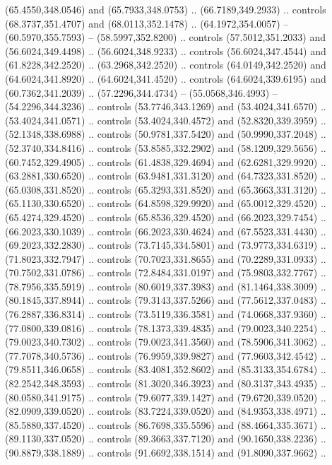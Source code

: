 \begin{scope}[cm={{1.25,0.0,0.0,-1.25,(0.0,743.43331)}}]
    (65.4550,348.0546) and (65.7933,348.0753) .. (66.7189,349.2933) .. controls
    (68.3737,351.4707) and (68.0113,352.1478) .. (64.1972,354.0057) --
    (60.5970,355.7593) -- (58.5997,352.8200) .. controls (57.5012,351.2033) and
    (56.6024,349.4498) .. (56.6024,348.9233) .. controls (56.6024,347.4544) and
    (61.8228,342.2520) .. (63.2968,342.2520) .. controls (64.0149,342.2520) and
    (64.6024,341.8920) .. (64.6024,341.4520) .. controls (64.6024,339.6195) and
    (60.7362,341.2039) .. (57.2296,344.4734) -- (55.0568,346.4993) --
    (54.2296,344.3236) .. controls (53.7746,343.1269) and (53.4024,341.6570) ..
    (53.4024,341.0571) .. controls (53.4024,340.4572) and (52.8320,339.3959) ..
    (52.1348,338.6988) .. controls (50.9781,337.5420) and (50.9990,337.2048) ..
    (52.3740,334.8416) .. controls (53.8585,332.2902) and (58.1209,329.5656) ..
    (60.7452,329.4905) .. controls (61.4838,329.4694) and (62.6281,329.9920) ..
    (63.2881,330.6520) .. controls (63.9481,331.3120) and (64.7323,331.8520) ..
    (65.0308,331.8520) .. controls (65.3293,331.8520) and (65.3663,331.3120) ..
    (65.1130,330.6520) .. controls (64.8598,329.9920) and (65.0012,329.4520) ..
    (65.4274,329.4520) .. controls (65.8536,329.4520) and (66.2023,329.7454) ..
    (66.2023,330.1039) .. controls (66.2023,330.4624) and (67.5523,331.4430) ..
    (69.2023,332.2830) .. controls (73.7145,334.5801) and (73.9773,334.6319) ..
    (71.8023,332.7947) .. controls (70.7023,331.8655) and (70.2289,331.0933) ..
    (70.7502,331.0786) .. controls (72.8484,331.0197) and (75.9803,332.7767) ..
    (78.7956,335.5919) .. controls (80.6019,337.3983) and (81.1464,338.3009) ..
    (80.1845,337.8944) .. controls (79.3143,337.5266) and (77.5612,337.0483) ..
    (76.2887,336.8314) .. controls (73.5119,336.3581) and (74.0668,337.9360) ..
    (77.0800,339.0816) .. controls (78.1373,339.4835) and (79.0023,340.2254) ..
    (79.0023,340.7302) .. controls (79.0023,341.3560) and (78.5906,341.3062) ..
    (77.7078,340.5736) .. controls (76.9959,339.9827) and (77.9603,342.4542) ..
    (79.8511,346.0658) .. controls (83.4081,352.8602) and (85.3133,354.6784) ..
    (82.2542,348.3593) .. controls (81.3020,346.3923) and (80.3137,343.4935) ..
    (80.0580,341.9175) .. controls (79.6077,339.1427) and (79.6720,339.0520) ..
    (82.0909,339.0520) .. controls (83.7224,339.0520) and (84.9353,338.4971) ..
    (85.5880,337.4520) .. controls (86.7698,335.5596) and (88.4664,335.3671) ..
    (89.1130,337.0520) .. controls (89.3663,337.7120) and (90.1650,338.2236) ..
    (90.8879,338.1889) .. controls (91.6692,338.1514) and (91.8090,337.9662) ..

\end{scope}
